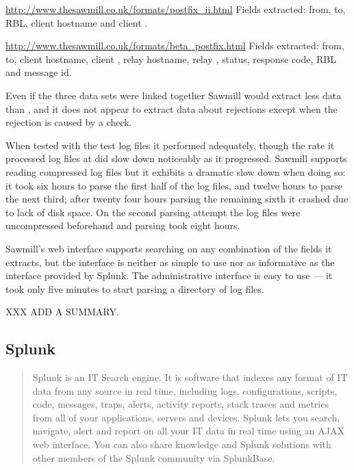 \url{http://www.thesawmill.co.uk/formats/postfix_ii.html} \newline{} Fields
extracted: from, to, RBL, client hostname and client \IP{}\@.

\url{http://www.thesawmill.co.uk/formats/beta_postfix.html} \newline{} Fields
extracted: from, to, client hostname, client \IP{}, relay hostname, relay
\IP{}, status, response code, RBL and message id.

Even if the three data sets were linked together Sawmill would extract less
data than \parsername{}, and it does not appear to extract data about
rejections except when the rejection is caused by a \DNSBL{} check.

When tested with the \numberOFlogFILES{} test log files it performed
adequately, though the rate it processed log files at did slow down
noticeably as it progressed.  Sawmill supports reading compressed log files
but it exhibits a dramatic slow down when doing so: it took six hours to
parse the first half of the log files, and twelve hours to parse the next
third; after twenty four hours parsing the remaining sixth it crashed due
to lack of disk space.  On the second parsing attempt the log files were
uncompressed beforehand and parsing took eight hours.

Sawmill's web interface supports searching on any combination of the fields
it extracts, but the interface is neither as simple to use nor as
informative as the interface provided by Splunk.  The administrative
interface is easy to use --- it took only five minutes to start parsing a
directory of log files.

XXX ADD A SUMMARY\@.

\subsection{Splunk}

\begin{quotation}

    Splunk is an IT Search engine. It is software that indexes any format
    of IT data from any source in real time, including logs,
    configurations, scripts, code, messages, traps, alerts, activity
    reports, stack traces and metrics from all of your applications,
    servers and devices. Splunk lets you search, navigate, alert and report
    on all your IT data in real time using an AJAX web interface. You can
    also share knowledge and Splunk solutions with other members of the
    Splunk community via SplunkBase.

\end{quotation}

